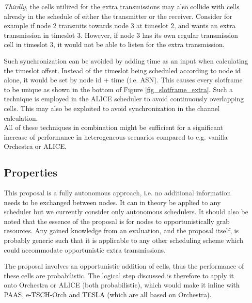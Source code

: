 \documentclass[journal,comsoc]{IEEEtran}
\begin{document}
\textit{Thirdly}, the cells utilized for the extra transmissions may also collide with cells already in the schedule of either the transmitter or the receiver. Consider for example if node 2 transmits towards node 3 at timeslot 2, and wants an extra transmission in timeslot 3. However, if node 3 has its own regular transmission cell in timeslot 3, it would not be able to listen for the extra transmission.

Such synchronization can be avoided by adding time as an input when calculating the timeslot offset. Instead of the timeslot being scheduled according to node id alone, it would be set by node id + time (i.e. ASN). This causes every slotframe to be unique as shown in the bottom of Figure \ref{fig_slotframe_extra}. Such a technique is employed in the ALICE scheduler to avoid continuously overlapping cells. This may also be exploited to avoid synchronization in the channel calculation.\\

All of these techniques in combination might be sufficient for a significant increase of performance in heterogeneous scenarios compared to e.g. vanilla Orchestra or ALICE.

\subsection{Properties}
This proposal is a fully autonomous approach, i.e. no additional information needs to be exchanged between nodes. It can in theory be applied to any scheduler but we currently consider only autonomous schedulers. It should also be noted that the essence of the proposal is for nodes to opportunistically grab resources. Any gained knowledge from an evaluation, and the proposal itself, is probably generic such that it is applicable to any other scheduling scheme which could accommodate opportunistic extra transmissions.

The proposal involves an opportunistic addition of cells, thus the performance of these cells are probabilistic. The logical step discussed is therefore to apply it onto Orchestra or ALICE (both probabilistic), which would make it inline with PAAS, e-TSCH-Orch and TESLA (which are all based on Orchestra).%
\end{document}
